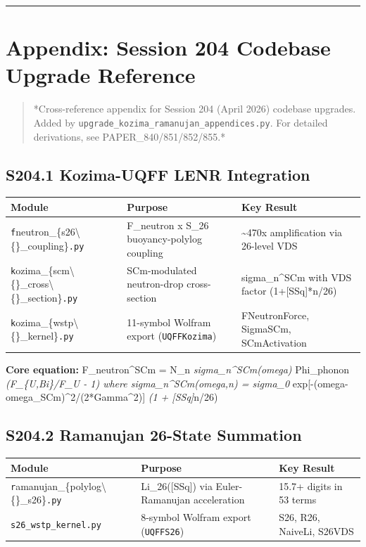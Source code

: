 \documentclass[11pt]{article}
\begin{document}
\noindent\rule{\textwidth}{0.4pt}

\section*{Appendix: Session 204 Codebase Upgrade Reference}

\begin{quote}
*Cross-reference appendix for Session 204 (April 2026) codebase upgrades.
Added by \verb|upgrade_kozima_ramanujan_appendices.py|. For detailed derivations,
see PAPER\_840/851/852/855.*
\end{quote}

\subsection*{S204.1 Kozima-UQFF LENR Integration}

\begin{center}
\begin{longtable}{lll}
\toprule
Module & Purpose & Key Result \tabularnewline
\midrule
\endhead
\verb|f|neutron\_\{s26\textbackslash\{\}\_coupling\}\verb|.py| & F\_neutron x S\_26 buoyancy-polylog coupling & \textasciitilde{}470x amplification via 26-level VDS \tabularnewline
\verb|k|ozima\_\{scm\textbackslash\{\}\_cross\textbackslash\{\}\_section\}\verb|.py| & SCm-modulated neutron-drop cross-section & sigma\_n\textasciicircum{}SCm with VDS factor (1+[SSq]*n/26) \tabularnewline
\verb|k|ozima\_\{wstp\textbackslash\{\}\_kernel\}\verb|.py| & 11-symbol Wolfram export (\verb|UQFFKozima|) & FNeutronForce, SigmaSCm, SCmActivation \tabularnewline
\bottomrule
\end{longtable}
\end{center}

\textbf{Core equation:} F\_neutron\textasciicircum{}SCm = N\_n \emph{ sigma\_n\textasciicircum{}SCm(omega) } Phi\_phonon \emph{ (F\_\{U,Bi\}/F\_U - 1) where sigma\_n\textasciicircum{}SCm(omega,n) = sigma\_0 } exp[-(omega-omega\_SCm)\textasciicircum{}2/(2*Gamma\textasciicircum{}2)] \emph{ (1 + [SSq]}n/26)

\subsection*{S204.2 Ramanujan 26-State Summation}

\begin{center}
\begin{longtable}{lll}
\toprule
Module & Purpose & Key Result \tabularnewline
\midrule
\endhead
\verb|r|amanujan\_\{polylog\textbackslash\{\}\_s26\}\verb|.py| & Li\_26([SSq]) via Euler-Ramanujan acceleration & 15.7+ digits in 53 terms \tabularnewline
\verb|s26_wstp_kernel.py| & 8-symbol Wolfram export (\verb|UQFFS26|) & S26, R26, NaiveLi, S26VDS \tabularnewline
\bottomrule
\end{longtable}
\end{center}
\end{document}
